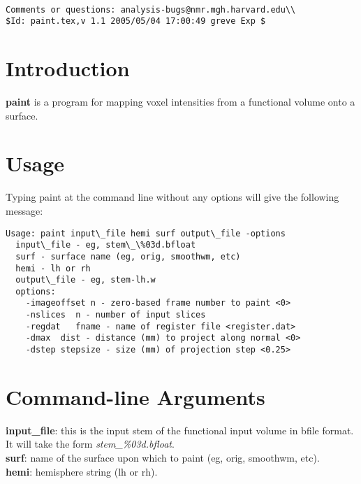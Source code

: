 \documentclass[10pt]{article}
\begin{document}
\begin{Large}
 \\
\end{Large}

\noindent 
\begin{verbatim}
Comments or questions: analysis-bugs@nmr.mgh.harvard.edu\\
$Id: paint.tex,v 1.1 2005/05/04 17:00:49 greve Exp $
\end{verbatim}

\section{Introduction}
{\bf paint} is a program for mapping voxel intensities from a
functional volume onto a surface.

\section{Usage}
Typing paint at the command line without any options will give the
following message:\\ 

\begin{small}
\begin{verbatim}
Usage: paint input\_file hemi surf output\_file -options
  input\_file - eg, stem\_\%03d.bfloat
  surf - surface name (eg, orig, smoothwm, etc)
  hemi - lh or rh
  output\_file - eg, stem-lh.w 
  options:
    -imageoffset n - zero-based frame number to paint <0>
    -nslices  n - number of input slices
    -regdat   fname - name of register file <register.dat>
    -dmax  dist - distance (mm) to project along normal <0>
    -dstep stepsize - size (mm) of projection step <0.25>
\end{verbatim}
\end{small}

\section{Command-line Arguments}

\noindent
{\bf input\_file}: this is the input stem of the functional input 
volume in bfile format.  It will take the form {\em
stem\_\%03d.bfloat}. \\

\noindent
{\bf surf}: name of the surface upon which to paint (eg, orig,
smoothwm, etc).\\

\noindent
{\bf hemi}: hemisphere string (lh or rh).\\
\end{document}
